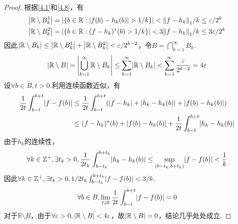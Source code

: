\begin{proof}
    根据\cref{4.1}和\cref{4.8}，有
    \begin{align*}
        &\abs*{\mathbb{R} \setminus B_k^1}=\abs*{\{b \in \mathbb{R}: \abs*{f(b)-h_k(b)}>1/k\}}<\norm*{f-h_k}_1/k \leq \varepsilon/2^k \\
        &\abs*{\mathbb{R} \setminus B_k^2}=\abs*{\{b \in \mathbb{R}: (f-h_k)^*(b)>1/k\}}<3\norm*{f-h_k}_1/k \leq 3\varepsilon/2^k
    \end{align*}
    因此\(\abs*{\mathbb{R} \setminus B_k} \leq \abs*{\mathbb{R} \setminus B_k^1}+\abs*{\mathbb{R} \setminus B_k^2}<\varepsilon/2^{k-2}\)，令\(B=\bigcap_{k=1}^\infty B_k\).
    \begin{align*}
        \abs*{\mathbb{R} \setminus B}=\abs*{\bigcup_{k=1}^\infty \mathbb{R} \setminus B_k} 
        \leq \sum_{k=1}^\infty \abs*{\mathbb{R} \setminus B_k}<\sum_{k=1}^\infty \frac{\varepsilon}{2^{k-2}}=4\varepsilon
    \end{align*}
    设\(\forall b \in B, t>0\).利用{\kaishu 连续函数近似}，有
    \begin{align*}
        \frac{1}{2t} \int_{b-t}^{b+t} \abs*{f-f(b)} &\leq \frac{1}{2t} \int_{b-t}^{b+t}(\abs*{f-h_k}+\abs*{h_k-h_k(b)}+\abs*{f(b)-h_k(b)}) \\
        &\leq (f-h_k)^*(b)+\abs*{f(b)-h_k(b)}+\frac{1}{2t} \int_{b-t}^{b+t} \abs*{h_k-h_k(b)} 
    \end{align*}
    由于\(h_k\)的连续性，
    \begin{align*}
        \forall k \in \mathbb{Z}^+, \exists t_k>0, \frac{1}{2t_k} \int_{b-t_k}^{b+t_k} \abs*{h_k-h_k(b)} \leq \sup_{(b-t_k,b+t_k)} \abs*{f-f(b)}<\frac{1}{k}
    \end{align*}
    因此\(\forall k \in \mathbb{Z}^+, \exists t_k>0, 1/2t_k \int_{b-t_k}^{b+t_k} \abs*{f-f(b)}<3/k\).
    \begin{align*}
        \forall b \in B, \lim_{t \downarrow 0} \frac{1}{2t} \int_{b-t}^{b+t} \abs*{f-f(b)}=0
    \end{align*}
    对于\(\mathbb{R} \setminus B\)，由于\(\forall \varepsilon>0, \abs*{\mathbb{R} \setminus B}<4\varepsilon\)，故\(\abs*{\mathbb{R} \setminus B}=0\)，结论几乎处处成立.
\end{proof}